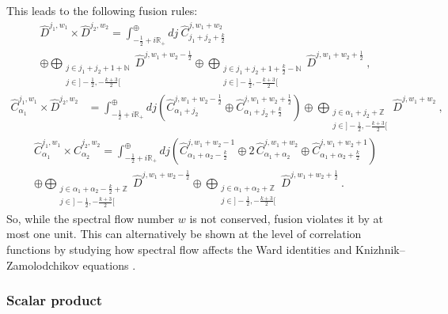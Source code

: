 \documentclass[12pt, a4paper, notitlepage, twoside]{report}
\numberwithin{equation}{section}
\theoremstyle{break}
\begin{document}
This leads to the following fusion rules:
\begin{multline}
\hat{D}^{j_1,w_1}\times \hat{D}^{j_2,w_2} = \int^\oplus_{-\frac12+i{\mathbb{R}}_+} dj\ \hat{C}^{j,w_1+w_2}_{j_1+j_2+\frac{k}{2}} 
\\ \oplus 
\bigoplus_{\substack{j\in j_1+j_2+1+{\mathbb{N}} \\ j\in ]-\frac12, -\frac{k+3}{2}[}} \hat{D}^{j,w_1+w_2-\frac12} \oplus 
\bigoplus_{\substack{j\in j_1+j_2+1+\frac{k}{2}-{\mathbb{N}} \\ j\in ]-\frac12, -\frac{k+3}{2}[}} \hat{D}^{j,w_1+w_2+\frac12}\ ,
\end{multline}
\begin{align}
 \hat{C}^{j_1,w_1}_{\alpha_1}\times \hat{D}^{j_2,w_2} &= \int^\oplus_{-\frac12+i{\mathbb{R}}_+} dj\left( \hat{C}^{j,w_1+w_2-\frac12}_{\alpha_1+j_2} \oplus \hat{C}^{j,w_1+w_2+\frac12}_{\alpha_1+j_2+\frac{k}{2}}\right) \oplus \bigoplus_{\substack{j\in \alpha_1+j_2+{\mathbb{Z}} \\ j\in ]-\frac12, -\frac{k+3}{2}[}} \hat{D}^{j,w_1+w_2}\ ,
\end{align}
\begin{multline}
 \hat{C}^{j_1,w_1}_{\alpha_1}\times \hat{C}^{j_2,w_2}_{\alpha_2} = \int^\oplus_{-\frac12+i{\mathbb{R}}_+} dj \left(\hat{C}^{j,w_1+w_2-1}_{\alpha_1+\alpha_2-\frac{k}{2}} \oplus 2\, \hat{C}^{j,w_1+w_2}_{\alpha_1+\alpha_2} \oplus \hat{C}^{j,w_1+w_2+1}_{\alpha_1+\alpha_2+\frac{k}{2}}\right) 
\\
\oplus \bigoplus_{\substack{j\in \alpha_1+\alpha_2-\frac{k}{2}+{\mathbb{Z}} \\ j\in]-\frac12, -\frac{k+3}{2}[}} \hat{D}^{j,w_1+w_2-\frac12} 
\oplus \bigoplus_{\substack{j\in \alpha_1+\alpha_2+{\mathbb{Z}} \\ j\in]-\frac12, -\frac{k+3}{2}[}} \hat{D}^{j,w_1+w_2+\frac12} \ .
\end{multline}
So, while the spectral flow number $w$ is not conserved, fusion violates it by at most one unit.
This can alternatively be shown at the level of correlation functions by studying how spectral flow affects the Ward identities and Knizhnik--Zamolodchikov equations \cite{rib05}.

\subsubsection{Scalar product}
\end{document}
